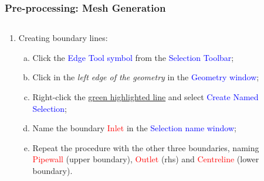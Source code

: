 \documentclass[10pt,compress, unknownkeysallowed]{beamer}
\newcommand{\red}{\textcolor{red}}
\newcommand{\blue}{\textcolor{blue}}
\begin{document}
 
\begin{frame}
 \frametitle{Pre-processing: Mesh Generation} 
    \begin{columns}
       \begin{column}[l]{0.5\linewidth}
          \begin{enumerate}\scriptsize\setcounter{enumi}{2}
             \item<1-> Creating boundary lines:
                \begin{enumerate}[a)]\scriptsize
                   \item<2-> Click the \blue{Edge Tool symbol} from the \blue{Selection Toolbar};
                   \item<2-> Click in the {\it left edge of the geometry} in the \blue{Geometry window};
                   \item<2-> Right-click the \underline{green highlighted line} and select \blue{Create Named Selection};
                   \item<3-> Name the boundary \red{Inlet} in the \blue{Selection name window};
                   \item<3-> Repeat the procedure with the other three boundaries, naming \red{Pipewall} (upper boundary), \red{Outlet} (rhs) and \red{Centreline} (lower boundary).
                \end{enumerate}
          \end{enumerate}
       \end{column}
       \begin{column}[l]{0.5\linewidth}
          \vbox{\vspace{-0.5cm}
          }
\end{column}
\end{columns}
\end{frame}
\end{document}
